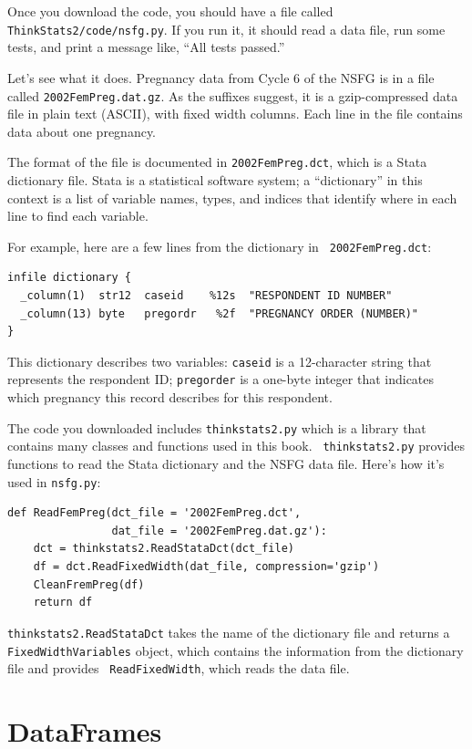 \documentclass[12pt]{book}
\begin{document}
Once you download the code, you should have a file called {\tt
  ThinkStats2/code/nsfg.py}.  If you run it, it should read a data
file, run some tests, and print a message like, ``All tests passed.''

Let's see what it does.  Pregnancy data from Cycle 6 of the NSFG is in
a file called {\tt 2002FemPreg.dat.gz}.  As the suffixes suggest, it
is a gzip-compressed data file in plain text (ASCII), with fixed width
columns.  Each line in the file contains data about one pregnancy.

The format of the file is documented in {\tt 2002FemPreg.dct}, which
is a Stata dictionary file.  Stata is a statistical software system;
a ``dictionary'' in this context is a list of variable names, types,
and indices that identify where in each line to find each variable.

For example, here are a few lines from the dictionary in {\tt
  2002FemPreg.dct}:
%
\begin{verbatim}
infile dictionary {
  _column(1)  str12  caseid    %12s  "RESPONDENT ID NUMBER"
  _column(13) byte   pregordr   %2f  "PREGNANCY ORDER (NUMBER)"
}
\end{verbatim}

This dictionary describes two variables: {\tt caseid} is a 12-character
string that represents the respondent ID; {\tt pregorder} is a 
one-byte integer that indicates which pregnancy this record
describes for this respondent.

The code you downloaded includes {\tt thinkstats2.py} which is a library
that contains many classes and functions used in this book.  {\tt
  thinkstats2.py} provides functions to read the Stata dictionary and
the NSFG data file.  Here's how it's used in {\tt nsfg.py}:

\begin{verbatim}
def ReadFemPreg(dct_file = '2002FemPreg.dct',
                dat_file = '2002FemPreg.dat.gz'):
    dct = thinkstats2.ReadStataDct(dct_file)
    df = dct.ReadFixedWidth(dat_file, compression='gzip')
    CleanFremPreg(df)
    return df
\end{verbatim}

{\tt thinkstats2.ReadStataDct} takes the name of the dictionary file
and returns a {\tt FixedWidthVariables} object, which contains the
information from the dictionary file and provides {\tt
  ReadFixedWidth}, which reads the data file.


\section{DataFrames}
\label{dataframe}
\end{document}

